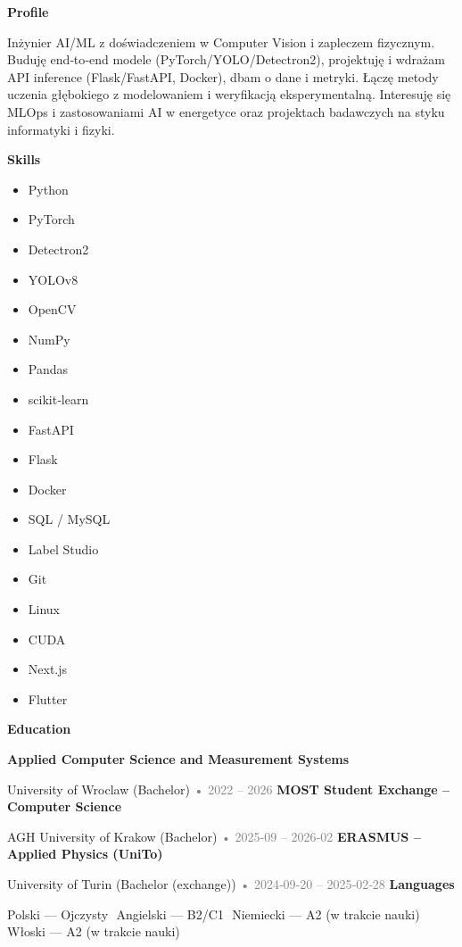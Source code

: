 \documentclass[11pt,a4paper]{article}
\newcommand{\sectiontitle}[1]{\vspace{2pt}\textbf{#1}\par\vspace{4pt}}
\begin{document}
\begin{paracol}{2}
\switchcolumn
\sectiontitle{Profile}
Inżynier AI/ML z doświadczeniem w Computer Vision i zapleczem fizycznym. Buduję end‑to‑end modele (PyTorch/YOLO/Detectron2), projektuję i wdrażam API inference (Flask/FastAPI, Docker), dbam o dane i metryki. Łączę metody uczenia głębokiego z modelowaniem i weryfikacją eksperymentalną. Interesuję się MLOps i zastosowaniami AI w energetyce oraz projektach badawczych na styku informatyki i fizyki.
\par
\vspace{6pt}
\sectiontitle{Skills}
\begin{itemize}[leftmargin=*]
\item Python
\item PyTorch
\item Detectron2
\item YOLOv8
\item OpenCV
\item NumPy
\item Pandas
\item scikit‑learn
\item FastAPI
\item Flask
\item Docker
\item SQL / MySQL
\item Label Studio
\item Git
\item Linux
\item CUDA
\item Next.js
\item Flutter
\end{itemize}
\vspace{6pt}
\sectiontitle{Education}
\textbf{Applied Computer Science and Measurement Systems}\par University of Wroclaw (Bachelor) \textcolor{gray}{• 2022 – 2026}\vspace{6pt}
\textbf{MOST Student Exchange – Computer Science}\par AGH University of Krakow (Bachelor) \textcolor{gray}{• 2025‑09 – 2026‑02}\vspace{6pt}
\textbf{ERASMUS – Applied Physics (UniTo)}\par University of Turin (Bachelor (exchange)) \textcolor{gray}{• 2024‑09‑20 – 2025‑02‑28}
\vspace{6pt}
\sectiontitle{Languages}
Polski — Ojczysty\,\, Angielski — B2/C1\,\, Niemiecki — A2 (w trakcie nauki)\,\, Włoski — A2 (w trakcie nauki)

\end{paracol}
\end{document}
